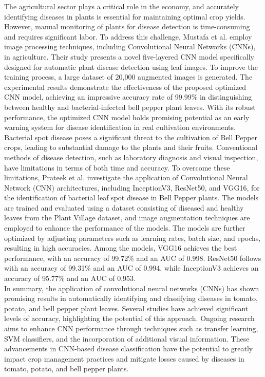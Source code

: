\documentclass[conference]{IEEEtran}
\begin{document}
The agricultural sector plays a critical role in the economy, and accurately identifying diseases in plants is essential for maintaining optimal crop yields. However, manual monitoring of plants for disease detection is time-consuming and requires significant labor. To address this challenge, Mustafa et al. \cite{mustafa2023pepper} employ image processing techniques, including Convolutional Neural Networks (CNNs), in agriculture. Their study presents a novel five-layered CNN model specifically designed for automatic plant disease detection using leaf images. To improve the training process, a large dataset of 20,000 augmented images is generated. The experimental results demonstrate the effectiveness of the proposed optimized CNN model, achieving an impressive accuracy rate of 99.99\% in distinguishing between healthy and bacterial-infected bell pepper plant leaves. With its robust performance, the optimized CNN model holds promising potential as an early warning system for disease identification in real cultivation environments.\\

Bacterial spot disease poses a significant threat to the cultivation of Bell Pepper crops, leading to substantial damage to the plants and their fruits. Conventional methods of disease detection, such as laboratory diagnosis and visual inspection, have limitations in terms of both time and accuracy. To overcome these limitations, Prateek et al. \cite{9565945} investigate the application of Convolutional Neural Network (CNN) architectures, including InceptionV3, ResNet50, and VGG16, for the identification of bacterial leaf spot disease in Bell Pepper plants. The models are trained and evaluated using a dataset consisting of diseased and healthy leaves from the Plant Village dataset, and image augmentation techniques are employed to enhance the performance of the models. The models are further optimized by adjusting parameters such as learning rates, batch size, and epochs, resulting in high accuracies. Among the models, VGG16 achieves the best performance, with an accuracy of 99.72\% and an AUC of 0.998. ResNet50 follows with an accuracy of 99.31\% and an AUC of 0.994, while InceptionV3 achieves an accuracy of 95.77\% and an AUC of 0.953.\\


In summary, the application of convolutional neural networks (CNNs) has shown promising results in automatically identifying and classifying diseases in tomato, potato, and bell pepper plant leaves. Several studies have achieved significant levels of accuracy, highlighting the potential of this approach. Ongoing research aims to enhance CNN performance through techniques such as transfer learning, SVM classifiers, and the incorporation of additional visual information. These advancements in CNN-based disease classification have the potential to greatly impact crop management practices and mitigate losses caused by diseases in tomato, potato, and bell pepper plants.
\end{document}
